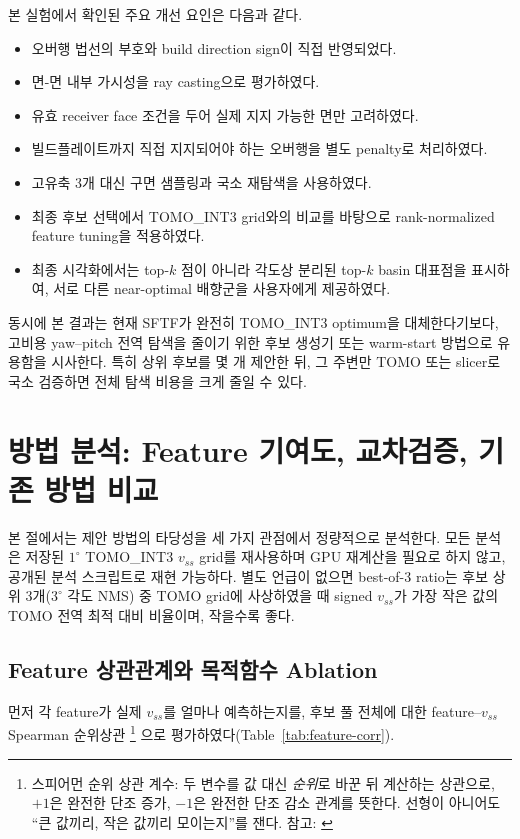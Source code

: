 \documentclass[11pt,a4paper]{article}
\begin{document}
본 실험에서 확인된 주요 개선 요인은 다음과 같다.

\begin{itemize}
\item 오버행 법선의 부호와 build direction sign이 직접 반영되었다.
\item 면-면 내부 가시성을 ray casting으로 평가하였다.
\item 유효 receiver face 조건을 두어 실제 지지 가능한 면만 고려하였다.
\item 빌드플레이트까지 직접 지지되어야 하는 오버행을 별도 penalty로 처리하였다.
\item 고유축 3개 대신 구면 샘플링과 국소 재탐색을 사용하였다.
\item 최종 후보 선택에서 TOMO\_INT3 grid와의 비교를 바탕으로 rank-normalized feature tuning을 적용하였다.
\item 최종 시각화에서는 top-$k$ 점이 아니라 각도상 분리된 top-$k$ basin 대표점을 표시하여,
서로 다른 near-optimal 배향군을 사용자에게 제공하였다.
\end{itemize}

동시에 본 결과는 현재 SFTF가 완전히 TOMO\_INT3 optimum을 대체한다기보다,
고비용 yaw--pitch 전역 탐색을 줄이기 위한 후보 생성기 또는 warm-start 방법으로 유용함을 시사한다.
특히 상위 후보를 몇 개 제안한 뒤,
그 주변만 TOMO 또는 slicer로 국소 검증하면 전체 탐색 비용을 크게 줄일 수 있다.

\section{방법 분석: Feature 기여도, 교차검증, 기존 방법 비교}

본 절에서는 제안 방법의 타당성을 세 가지 관점에서 정량적으로 분석한다.
모든 분석은 저장된 $1^\circ$ TOMO\_INT3 $v_{ss}$ grid를 재사용하며 GPU 재계산을 필요로 하지 않고,
공개된 분석 스크립트로 재현 가능하다.
별도 언급이 없으면 best-of-3 ratio는 후보 상위 3개($3^\circ$ 각도 NMS) 중 TOMO grid에 사상하였을 때
signed $v_{ss}$가 가장 작은 값의 TOMO 전역 최적 대비 비율이며, 작을수록 좋다.

\subsection{Feature 상관관계와 목적함수 Ablation}
\label{sec:ablation}

먼저 각 feature가 실제 $v_{ss}$를 얼마나 예측하는지를, 후보 풀 전체에 대한
feature--$v_{ss}$ Spearman 순위상관%
\footnote{스피어먼 순위 상관 계수: 두 변수를 값 대신 \emph{순위}로 바꾼 뒤 계산하는 상관으로,
$+1$은 완전한 단조 증가, $-1$은 완전한 단조 감소 관계를 뜻한다. 선형이 아니어도 ``큰 값끼리,
작은 값끼리 모이는지''를 잰다. 참고: \cite{spearman1904}}
으로 평가하였다(Table~\ref{tab:feature-corr}).
\end{document}
